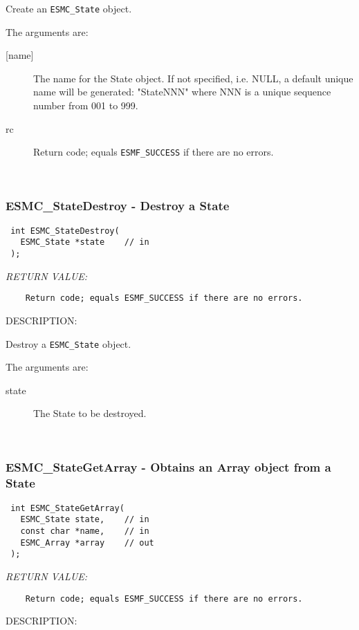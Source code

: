   
    Create an {\tt ESMC\_State} object.
  
    The arguments are:
    \begin{description}
    \item[{[name]}]
      The name for the State object. If not specified, i.e. NULL,
      a default unique name will be generated: "StateNNN" where NNN
      is a unique sequence number from 001 to 999.
    \item[rc]
      Return code; equals {\tt ESMF\_SUCCESS} if there are no errors.
    \end{description}
   
 
\mbox{}\hrulefill\ 
 
\subsubsection [ESMC\_StateDestroy] {ESMC\_StateDestroy - Destroy a State}


  
\begin{verbatim} int ESMC_StateDestroy(
   ESMC_State *state    // in
 );\end{verbatim}{\em RETURN VALUE:}
\begin{verbatim}    Return code; equals ESMF_SUCCESS if there are no errors.\end{verbatim}
{\sf DESCRIPTION:\\ }


  
    Destroy a {\tt ESMC\_State} object.
  
    The arguments are:
    \begin{description}
    \item[state]
      The State to be destroyed.
    \end{description}
   
 
\mbox{}\hrulefill\ 
 
\subsubsection [ESMC\_StateGetArray] {ESMC\_StateGetArray - Obtains an Array object from a State}


  
\begin{verbatim} int ESMC_StateGetArray(
   ESMC_State state,    // in
   const char *name,    // in
   ESMC_Array *array    // out
 );\end{verbatim}{\em RETURN VALUE:}
\begin{verbatim}    Return code; equals ESMF_SUCCESS if there are no errors.\end{verbatim}
{\sf DESCRIPTION:\\ }



